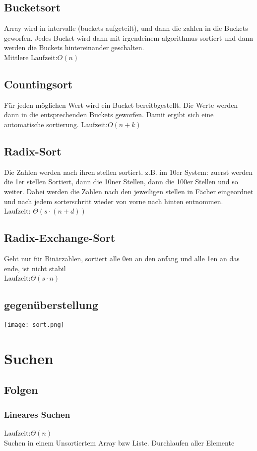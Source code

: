 \documentclass[a4paper]{scrartcl}
\begin{document}
\subsection{Bucketsort}
Array wird in intervalle (buckets aufgeteilt), und dann die zahlen in die Buckets geworfen. Jedes Bucket wird dann mit irgendeinem algorithmus sortiert und dann werden die Buckets hintereinander geschalten.\\
Mittlere Laufzeit:$O(n)$\\
\subsection {Countingsort}
Für jeden möglichen Wert wird ein Bucket bereitbgestellt. Die Werte werden dann in die entsprechenden Buckets geworfen. Damit ergibt sich eine automatische sortierung.
Laufzeit:$O(n+k)$\\
\subsection{Radix-Sort} 
Die Zahlen werden nach ihren stellen sortiert. z.B. im 10er System: zuerst werden die 1er stellen Sortiert, dann die 10ner Stellen, dann die 100er Stellen und so weiter. Dabei werden die Zahlen nach den jeweiligen stellen in Fächer eingeordnet und nach jedem sorterschritt wieder von vorne nach hinten entnommen. \\
Laufzeit: $\Theta(s\cdot(n+d))$\\
\subsection{Radix-Exchange-Sort}
Geht nur für Binärzahlen, sortiert alle 0en an den anfang und alle 1en an das ende, ist nicht stabil\\
Laufzeit:$\Theta(s\cdot n)$\\
\subsection {gegenüberstellung}
\texttt{[image: sort.png]}
\section{Suchen}
\subsection{Folgen}
\subsubsection{Lineares Suchen}
Laufzeit:$\Theta(n)$\\
Suchen in einem Unsortiertem Array bzw Liste. Durchlaufen aller Elemente
\end{document}
